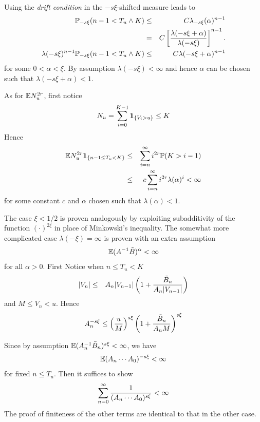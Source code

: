 \documentclass{beamer}
\begin{document}
\begin{frame}
  Using the {\it drift condition} in the $-s\xi$-shifted measure leads to
  \begin{eqnarray*}
    \P_{-s\xi}(n-1 < T_u \wedge K) &\leq& C
    \lambda_{-s\xi}(\alpha)^{n-1} \\
    &=& C \left[
      {
      \lambda(-s\xi + \alpha)
      \over
      \lambda(-s\xi)
    }
    \right]^{n-1}. \\
    \lambda(-s\xi)^{n-1} \P_{-s\xi}(n-1 < T_u \wedge K) &\leq& C
    \lambda(-s\xi + \alpha)^{n-1}
  \end{eqnarray*}
  for some $0 < \alpha < \xi$. By assumption $\lambda(-s\xi) < \infty$
  and hence $\alpha$ can be chosen such that $\lambda(-s\xi + \alpha)
  < 1$.
\end{frame}

\begin{frame}
  As for $\E N_u^{2r}$, first notice
  \[
  N_u = \sum_{i=0}^{K-1} \1{V_i > u} \leq K
  \]
  Hence
  \begin{eqnarray*}
    \E N_u^{2r}\1{n-1 \leq T_u < K} &\leq& \sum_{i=n}^\infty i^{2r}
    \P(K > i-1) \\
    &\leq& c \sum_{i=n}^\infty i^{2r} \lambda(\alpha)^i < \infty
  \end{eqnarray*}
  for some constant $c$ and $\alpha$ chosen such that $\lambda(\alpha)
  < 1$.
\end{frame}

\begin{frame}
  The case $\xi < 1/2$ is proven analogously by exploiting
  subadditivity of the function $(\cdot)^{2\xi}$ in place of
  Minkowski's inequality. The somewhat more complicated case
  $\lambda(-\xi) = \infty$ is proven with an extra assumption
  \[
  \E (A^{-1} \tilde B)^\alpha < \infty
  \]
  for all $\alpha > 0$. First Notice when $n \leq T_u < K$
  \begin{eqnarray*}
    |V_n| &\leq& A_n |V_{n-1}| \left(
      1 + {
        \tilde B_n
        \over
        A_n |V_{n-1}|
      }
    \right)
  \end{eqnarray*}
  and $M \leq V_n < u$. Hence
  \[
  A_n^{-s\xi} \leq \left(
    {
      u \over M
    }
    \right)^{s\xi} 
    \left(
    1 + {
      \tilde B_n
      \over
      A_n M
    }
  \right)^{s\xi}
  \]
\end{frame}

\begin{frame}
  Since by assumption $\E (A_n^{-1} \tilde B_n)^{s\xi} < \infty$, we
  have
  \[
  \E (A_{n} \cdots A_0)^{-s\xi} < \infty
  \]
  for fixed $n \leq T_u$. Then it suffices to show
  \[
  \sum_{n=0}^\infty {
    1 \over
    (A_n \cdots A_0)^{s\xi}
  } < \infty
  \]
  The proof of finiteness of the other terms are identical to that in
  the other case.
\end{frame}
\end{document}
